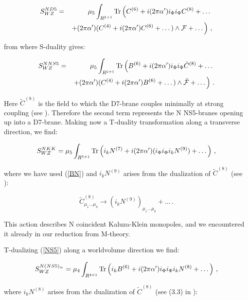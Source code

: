 \documentclass[12pt,a4paper]{article}
\begin{document}
\begin{eqnarray}
S^{N D5}_{WZ}&=&\mu_5\int_{R^{5+1}}{\rm Tr}\left(C^{(6)}+
i(2\pi\alpha^\prime)i_\Phi i_\Phi C^{(8)}+\dots\right.\nonumber\\
&&\left. +(2\pi\alpha^\prime)(C^{(4)}+i(2\pi\alpha^\prime)C^{(6)}+\dots)
\wedge {\cal F}+\dots\right)\, ,
\end{eqnarray}

\noindent from where S-duality gives:

\begin{eqnarray}
\label{NS5}
S^{N NS5}_{WZ}&=&\mu_5\int_{R^{5+1}}{\rm Tr}\left(B^{(6)}+
i(2\pi\alpha^\prime)i_\Phi i_\Phi 
{\tilde C}^{(8)}+\dots\right.\nonumber\\
&&\left. +(2\pi\alpha^\prime)(C^{(4)}+i(2\pi\alpha^\prime)B^{(6)}+
\dots)\wedge {\tilde {\cal F}}+\dots\right)\, .
\end{eqnarray}

\noindent Here ${\tilde C}^{(8)}$ is the field to which the 
D7-brane couples minimally at strong coupling (see \cite{EL}).
Therefore the second term represents the N NS5-branes opening
up into a D7-brane. 
Making now a T-duality transformation along a transverse direction,
we find:

\begin{equation}
S^{N KK}_{WZ}=\mu_5\int_{R^{5+1}}{\rm Tr}\left(i_k N^{(7)}+
i(2\pi\alpha^\prime)(i_\Phi i_\Phi i_k N^{(9)})+\dots\right)\, ,
\end{equation}

\noindent where we have used (\ref{BN}) and $i_k N^{(9)}$ 
arises from the dualization of ${\tilde C}^{(8)}$ (see \cite{EL}):

\begin{equation}
{\tilde C}^{(8)}_{\mu_1\dots\mu_8}\rightarrow 
(i_k N^{(9)})_{\mu_1\dots\mu_8}+\dots\, .
\end{equation}

\noindent This action describes N coincident Kaluza-Klein monopoles,
and we encountered it already in our reduction from M-theory.

T-dualizing (\ref{NS5}) along a worldvolume direction we find:

\begin{equation}
S^{N (NS5)_w}_{WZ}=\mu_4\int_{R^{4+1}}{\rm Tr}\left(i_k B^{(6)}+
i(2\pi\alpha^\prime)i_\Phi i_\Phi i_k N^{(8)}+\dots\right)\, ,
\end{equation}

\noindent where $i_k N^{(8)}$ arises from the dualization of 
${\tilde C}^{(8)}$ (see (3.3) in \cite{EL}):
\end{document}
